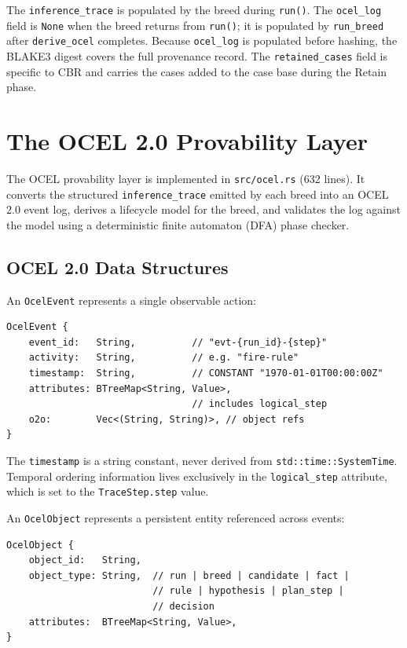 The \texttt{inference\_trace} is populated by the breed during \texttt{run()}. The \texttt{ocel\_log} field is \texttt{None} when the breed returns from \texttt{run()}; it is populated by \texttt{run\_breed} after \texttt{derive\_ocel} completes. Because \texttt{ocel\_log} is populated before hashing, the BLAKE3 digest covers the full provenance record. The \texttt{retained\_cases} field is specific to CBR and carries the cases added to the case base during the Retain phase.

\section{The OCEL 2.0 Provability Layer}
\label{sec:ocel-layer}

The OCEL provability layer is implemented in \texttt{src/ocel.rs} (632 lines). It converts the structured \texttt{inference\_trace} emitted by each breed into an OCEL 2.0 event log, derives a lifecycle model for the breed, and validates the log against the model using a deterministic finite automaton (DFA) phase checker.

\subsection{OCEL 2.0 Data Structures}

An \texttt{OcelEvent} represents a single observable action:

\begin{verbatim}
OcelEvent {
    event_id:   String,          // "evt-{run_id}-{step}"
    activity:   String,          // e.g. "fire-rule"
    timestamp:  String,          // CONSTANT "1970-01-01T00:00:00Z"
    attributes: BTreeMap<String, Value>,
                                 // includes logical_step
    o2o:        Vec<(String, String)>, // object refs
}
\end{verbatim}

The \texttt{timestamp} is a string constant, never derived from \texttt{std::time::SystemTime}. Temporal ordering information lives exclusively in the \texttt{logical\_step} attribute, which is set to the \texttt{TraceStep.step} value.

An \texttt{OcelObject} represents a persistent entity referenced across events:

\begin{verbatim}
OcelObject {
    object_id:   String,
    object_type: String,  // run | breed | candidate | fact |
                          // rule | hypothesis | plan_step |
                          // decision
    attributes:  BTreeMap<String, Value>,
}
\end{verbatim}

